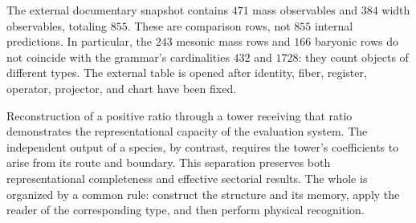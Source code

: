 The external documentary snapshot contains \(471\) mass observables and
\(384\) width observables, totaling \(855\). These are comparison rows, not
\(855\) internal predictions. In particular, the \(243\) mesonic mass
rows and \(166\) baryonic rows do not coincide with the grammar's cardinalities
\(432\) and \(1728\): they count objects of different types.
The external table is opened after identity, fiber, register,
operator, projector, and chart have been fixed.

Reconstruction of a positive ratio through a tower receiving that
ratio demonstrates the representational capacity of the evaluation system.
The independent output of a species, by contrast, requires the tower's
coefficients to arise from its route and boundary. This
separation preserves both representational completeness and effective
sectorial results. The whole is organized by a
common rule: construct the structure and its memory, apply the reader
of the corresponding type, and then perform physical recognition.
